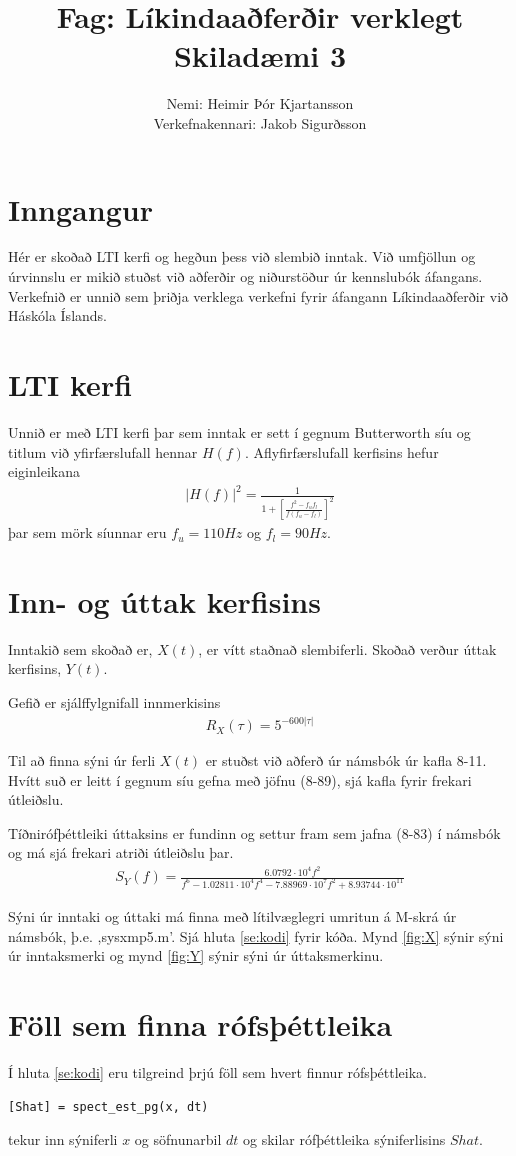 \documentclass[11pt,a4paper]{article}
\author{Nemi: Heimir Þór Kjartansson\\Verkefnakennari: Jakob Sigurðsson}
\title{Fag: Líkindaaðferðir verklegt \\ Skiladæmi 3}
\begin{document}
\maketitle
\section{Inngangur}
Hér er skoðað LTI kerfi og hegðun þess við slembið inntak. Við umfjöllun
og úrvinnslu er mikið stuðst við aðferðir og niðurstöður úr kennslubók
áfangans. Verkefnið er unnið sem þriðja verklega verkefni fyrir áfangann
Líkindaaðferðir við Háskóla Íslands.
\section{LTI kerfi}
Unnið er með LTI kerfi þar sem inntak er sett í gegnum Butterworth síu
og titlum við yfirfærslufall hennar $H(f)$. 
Aflyfirfærslufall kerfisins hefur eiginleikana
\begin{eqnarray*}
    |H(f)|^2 = \frac{1}{1+\left[\frac{f^2-f_uf_l}{f(f_u-f_l)}\right]^2}
\end{eqnarray*}
þar sem mörk síunnar eru $f_u=110Hz$ og $f_l=90Hz$.
\section{Inn- og úttak kerfisins} 
Inntakið sem skoðað er, $X(t)$, er vítt staðnað slembiferli. Skoðað 
verður úttak kerfisins, $Y(t)$.

Gefið er sjálffylgnifall innmerkisins
\begin{eqnarray*}
    R_X(\tau)=5^{-600|\tau|}
\end{eqnarray*}

Til að finna sýni úr ferli $X(t)$ er stuðst við aðferð úr námsbók úr kafla 8-11. Hvítt suð er leitt í gegnum síu
gefna með jöfnu (8-89), sjá kafla fyrir frekari útleiðslu.

Tíðnirófþéttleiki úttaksins er fundinn og settur fram sem jafna
(8-83) í námsbók og má sjá frekari atriði útleiðslu þar.
\begin{eqnarray*}
    S_Y(f)=\frac{6.0792\cdot 10^4 f^2}{f^6 -1.02811\cdot 10^4 f^4
    -7.88969\cdot 10^7 f^2 +8.93744 \cdot 10^{11}}
\end{eqnarray*}

Sýni úr inntaki og úttaki má finna með lítilvæglegri umritun á M-skrá úr 
námsbók, þ.e. ,sysxmp5.m'. Sjá hluta \ref{se:kodi} fyrir kóða. Mynd \ref{fig:X} sýnir sýni úr inntaksmerki 
og mynd \ref{fig:Y} sýnir sýni úr úttaksmerkinu.
\section{Föll sem finna rófsþéttleika} \label{se:foll}
Í hluta \ref{se:kodi} eru tilgreind þrjú föll sem hvert finnur 
rófsþéttleika. 
\begin{verbatim}
[Shat] = spect_est_pg(x, dt)
\end{verbatim}
tekur inn sýniferli $x$ og söfnunarbil $dt$ og skilar rófþéttleika 
sýniferlisins $Shat$.
\end{document}
